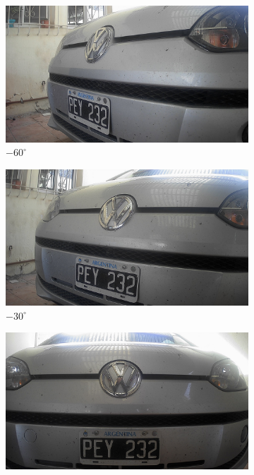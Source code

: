 \begin{figure}[bth]
    \centering
    \begin{subfigure}{.15\textwidth}
        \centering
        \includegraphics[width=\textwidth]{imgs/test-angulos/-60_50.jpg}
        \caption{$-60^\circ$}
    \end{subfigure}
    \begin{subfigure}{.15\textwidth}
        \centering
        \includegraphics[width=\textwidth]{imgs/test-angulos/-30_50.jpg}
        \caption{$-30^\circ$}
    \end{subfigure}
    \begin{subfigure}{.15\textwidth}
        \centering
        \includegraphics[width=\textwidth]{imgs/test-angulos/0_50.jpg}

\end{subfigure}
\end{figure}

